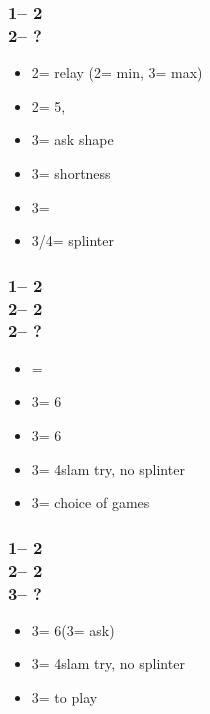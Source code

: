 \documentclass[12pt, a4paper]{report}
\begin{document}
{{        \subsubsection*{1\nt -- 2\clubs\\
                        2\hearts -- ?}
        \begin{itemize}
            \item 2\spades = relay (2\nt = min, 3\clubs = max)
            \item 2\nt = 5\spades, \inv
            \item 3\clubs = ask shape
            \item 3\diams = \minor shortness
            \item 3\hearts = \inv
            \item 3\spades/4\minor = splinter
        \end{itemize}

        \subsubsection*{1\nt -- 2\clubs\\
                        2\hearts -- 2\spades\\
                        2\nt -- ?}
        \begin{itemize}
            \item \pass = \inv\ \bal
            \item 3\clubs = 6\spades\ \inv
            \item 3\diams = 6\spades\ \inv
            \item 3\hearts = 4\hearts slam try, no splinter
            \item 3\nt = choice of games
        \end{itemize}

        \subsubsection*{1\nt -- 2\clubs\\
                        2\hearts -- 2\spades\\
                        3\clubs -- ?}
        \begin{itemize}
            \item 3\diams = 6\spades (3\hearts = ask)
            \item 3\hearts = 4\hearts slam try, no splinter
            \item 3\nt = to play
        \end{itemize}

}}
\end{document}
